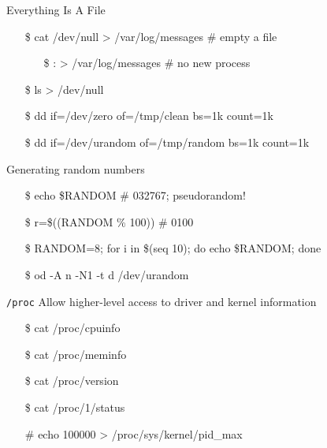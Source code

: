 \begin{frame}{Everything Is A File}\ttfamily
  \begin{itemize}
  \item[\$] cat /dev/null > /var/log/messages \# empty a file
    \begin{itemize}
    \item[\$] : > /var/log/messages \# no new process
    \end{itemize}
  \item[\$] ls > /dev/null
  \item[\$] dd if=/dev/zero of=/tmp/clean bs=1k count=1k
  \item[\$] dd if=/dev/urandom of=/tmp/random bs=1k count=1k
  \end{itemize}
  \begin{iblock}{{\normalfont Generating random numbers}}
    \begin{itemize}
    \item[\$] echo \$RANDOM \# 0\range{}32767; pseudorandom!
    \item[\$] r=\$((RANDOM \% 100)) \# 0\range{}100
    \item[\$] RANDOM=8; for i in \$(seq 10); do echo \$RANDOM; done
    \item[\$] od -A n -N1 -t d /dev/urandom
    \end{itemize}
  \end{iblock}
\end{frame}

\begin{frame}{\texttt{/proc}}
  Allow higher-level access to driver and kernel information
  \ttfamily
  \begin{itemize}
  \item[\$] cat /proc/cpuinfo
  \item[\$] cat /proc/meminfo
  \item[\$] cat /proc/version
  \item[\$] cat /proc/1/status
  \item[\#] echo 100000 > /proc/sys/kernel/pid\_max
  \end{itemize}
\end{frame}

